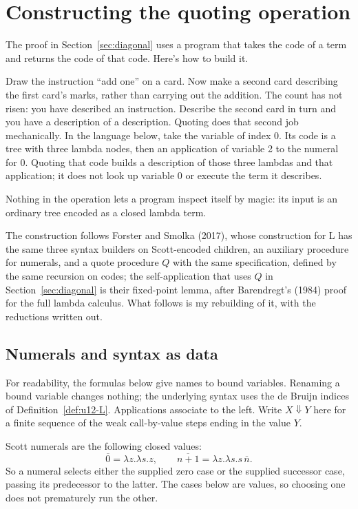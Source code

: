 \documentclass[11pt,twoside]{article}
\theoremstyle{thielethm}
\theoremstyle{thieledef}
\theoremstyle{thieledef}
\theoremstyle{thieledef}
\theoremstyle{thielethm}
\theoremstyle{thieleobs}
\theoremstyle{thielethm}
\begin{document}


\section{Constructing the quoting operation}

The proof in Section~\ref{sec:diagonal} uses a program that takes the code of a term
and returns the code of that code. Here's how to build it.

Draw the instruction ``add one'' on a card. Now make a second card describing the
first card's marks, rather than carrying out the addition. The count has not risen:
you have described an instruction. Describe the second card in turn and you have
a description of a description. Quoting does that second job mechanically. In the
language below, take the variable of index 0. Its code is a tree with three lambda
nodes, then an application of variable 2 to the numeral for 0. Quoting that code
builds a description of those three lambdas and that application; it does not
look up variable 0 or execute the term it describes.

Nothing in the operation lets a program inspect itself by magic: its input is an
ordinary tree encoded as a closed lambda term.

The construction follows Forster and Smolka (2017), whose construction for L has the same
three syntax builders on Scott-encoded children, an auxiliary procedure for numerals, and a quote
procedure $Q$ with the same specification, defined by the same recursion on codes; the
self-application that uses $Q$ in Section~\ref{sec:diagonal} is their fixed-point lemma, after
Barendregt's (1984) proof for the full lambda calculus. What follows is my rebuilding of it, with
the reductions written out.

\subsection{Numerals and syntax as data}

For readability, the formulas below give names to bound variables. Renaming a bound
variable changes nothing; the underlying syntax uses the de Bruijn indices of
Definition~\ref{def:u12-L}. Applications associate to the left. Write $X\Downarrow Y$
here for a finite sequence of the weak call-by-value steps ending in the value $Y$.

Scott numerals are the following closed values:
\[
\overline{0}=\lambda z.\lambda s.z,
\qquad
\overline{n+1}=\lambda z.\lambda s.s\,\overline n.
\]
So a numeral selects either the supplied zero case or the supplied successor case,
passing its predecessor to the latter. The cases below are values, so choosing one
does not prematurely run the other.
\end{document}
